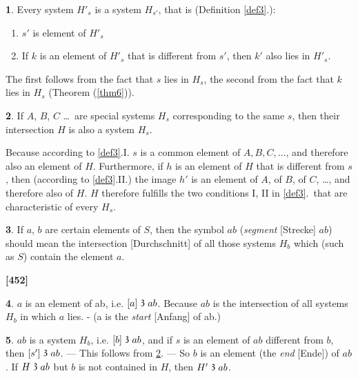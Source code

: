 \documentclass[leqno,hidelinks,a4paper]{article}
\theoremstyle{definition}
\newtheorem{satz}{\protect\satzname}
\newtheorem{deff}[satz]{\protect\deffname}
\newcommand{\satzname}{}
\newcommand{\deffname}{}
\renewcommand{\satzname}{\hspace{-4pt}.\ Satz}%
\renewcommand{\deffname}{\hspace{-4pt}.\ Definition}%
\renewcommand{\satzname}{\hspace{-4pt}.\ Theorem}%
\renewcommand{\deffname}{\hspace{-4pt}.\ Definition}%
\newcommand\partof{\mathrel{\raisebox{0.45ex}{$\mathfrak{3}$}}}
\begin{document}
\begin{satz}\label{thm7}
Every system $H'_s$ is a system $H_{s'}$, that is (Definition \ref{def3}.):
\begin{enumerate}[I'.]
	\item $s'$ is element of $H'_s$
	\item If $k$ is an element of $H'_s$ that is different from $s'$, then $k'$ also lies in $H'_s$.
\end{enumerate}\end{satz}

The first follows from the fact that $s$ lies in $H_s$, the second from the fact that $k$ lies in $H_s$ (Theorem (\ref{thm6})).

\begin{satz}\label{thm8}
If $A$, $B$, $C$ \ldots\ are special systems $H_s$ corresponding to the same $s$, then their intersection $H$ is also a system $H_s$.\end{satz}

Because according to \ref{def3}.I. $s$ is a common element of $A, B, C, \ldots$, and therefore also an element of $H$.
Furthermore, if $h$ is an element of $H$ that is different from $s$, then (according to \ref{def3}.II.) the image $h'$ is an element of $A$, of $B$, of $C$, \ldots, and therefore also of $H$.
$H$ therefore fulfills the two conditions I, II in \ref{def3}.\ that are characteristic of every $H_s$.

\begin{deff}\label{def9}
If $a$, $b$ are certain elements of $S$, then the symbol $ab$ (\emph{segment} [Strecke] $ab$) should mean the intersection [Durchschnitt] of all those systems $H_b$  which (such as $S$) contain the element $a$.
\end{deff}

\noindent \textbf{[452]}

\begin{satz}\label{thm10}
$a$ is an element of ab, i.e. $[a] \partof ab$. Because $ab$ is the intersection of all systems $H_b$ in which $a$ lies. - (a is the \emph{start} [Anfang] of ab.)
\end{satz}

\begin{satz}\label{thm11}
$ab$ is a system $H_b$, i.e. $[b] \partof ab$, and if $s$ is an element of $ab$ different from $b$, then $[s'] \partof ab$.
--- This follows from \ref{thm8}. --- So $b$ is an element (the \emph{end} [Ende]) of $ab$. If $H \partof ab$ but $b$ is not contained in $H$, then $H' \partof ab$.
\end{satz}
\end{document}
